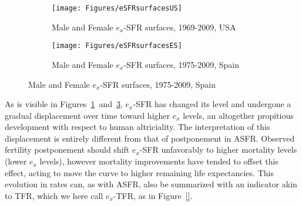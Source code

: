\begin{figure}
        \centering
        \begin{subfigure}
                \centering
                \caption{Male and Female $e_x$-SFR surfaces, 1969-2009, USA}
                \texttt{[image: Figures/eSFRsurfacesUS]}
                \label{fig:exSFRsurfUS}
        \end{subfigure}
        \begin{subfigure}
                \centering
                \caption{Male and Female $e_x$-SFR surfaces, 1975-2009, Spain}
                \texttt{[image: Figures/eSFRsurfacesES]} 
                \label{fig:exSFRsurfES}
        \end{subfigure}
\end{figure}

As is visible in Figures~\ref{fig:exSFRsurfUS}~and~\ref{fig:exSFRsurfES}, 
$e_x$-SFR has changed its level and undergone a gradual displacement over 
time toward higher $e_x$ levels, an altogether propitious development
with respect to human altriciality. The interpretation of this displacement is
entirely different from that of postponement in ASFR. Observed fertility 
postponement should shift $e_x$-SFR unfavorably to higher mortality 
levels (lower $e_x$ levels), however mortality improvements have tended to 
offset this effect, acting to move the curve to higher
remaining life expectancies. This evolution in rates can, as with ASFR, also be
summarized with an indicator akin to TFR, which we here call $e_x$-TFR, as in
Figure~\ref{}.











